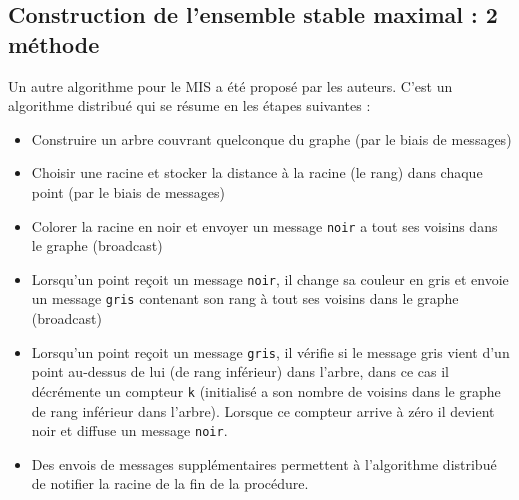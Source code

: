 \subsection{Construction de l'ensemble stable maximal : 2 méthode}
Un autre algorithme pour le MIS a été proposé par les auteurs. C'est un algorithme distribué qui se résume en les étapes suivantes :
\begin{itemize}
\item Construire un arbre couvrant quelconque du graphe (par le biais de messages)
\item Choisir une racine et stocker la distance à la racine (le rang) dans chaque point (par le biais de messages)
\item Colorer la racine en noir et envoyer un message \verb?noir? a tout ses voisins dans le graphe (broadcast)
\item Lorsqu'un point reçoit un message \verb?noir?, il change sa couleur en gris et envoie un message \verb?gris? contenant son rang à tout ses voisins dans le graphe (broadcast)
\item Lorsqu'un point reçoit un message \verb?gris?, il vérifie si le message gris vient d'un point au-dessus de lui (de rang inférieur) dans l'arbre, dans ce cas il décrémente un compteur \verb?k? (initialisé a son nombre de voisins dans le graphe de rang inférieur dans l'arbre). Lorsque ce compteur arrive à zéro il devient noir et diffuse un message \verb?noir?.
\item Des envois de messages supplémentaires permettent à l'algorithme distribué de notifier la racine de la fin de la procédure.
\end{itemize}

